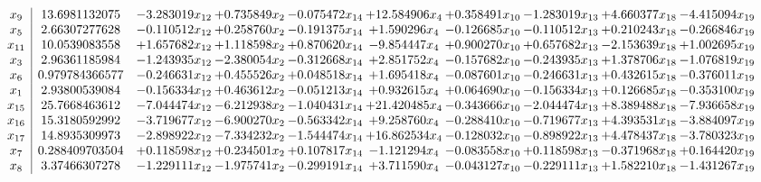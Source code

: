 \documentclass[10pt]{article}
\begin{document}
 \[\begin{array}{c| c c@{\hskip 2pt} c@{\hskip 2pt} c@{\hskip 2pt} c@{\hskip 2pt} c@{\hskip 2pt} c@{\hskip 2pt} c@{\hskip 2pt} c@{\hskip 2pt} }
 x_{9}   &  13.6981132075 & -3.283019 x_{12} & + 0.735849 x_{2} & -0.075472 x_{14} & + 12.584906 x_{4} & + 0.358491 x_{10} & -1.283019 x_{13} & + 4.660377 x_{18} & -4.415094 x_{19}\\
 x_{5}   &  2.66307277628 & -0.110512 x_{12} & + 0.258760 x_{2} & -0.191375 x_{14} & + 1.590296 x_{4} & -0.126685 x_{10} & -0.110512 x_{13} & + 0.210243 x_{18} & -0.266846 x_{19}\\
 x_{11}   &  10.0539083558 & + 1.657682 x_{12} & + 1.118598 x_{2} & + 0.870620 x_{14} & -9.854447 x_{4} & + 0.900270 x_{10} & + 0.657682 x_{13} & -2.153639 x_{18} & + 1.002695 x_{19}\\
 x_{3}   &  2.96361185984 & -1.243935 x_{12} & -2.380054 x_{2} & -0.312668 x_{14} & + 2.851752 x_{4} & -0.157682 x_{10} & -0.243935 x_{13} & + 1.378706 x_{18} & -1.076819 x_{19}\\
 x_{6}   &  0.979784366577 & -0.246631 x_{12} & + 0.455526 x_{2} & + 0.048518 x_{14} & + 1.695418 x_{4} & -0.087601 x_{10} & -0.246631 x_{13} & + 0.432615 x_{18} & -0.376011 x_{19}\\
 x_{1}   &  2.93800539084 & -0.156334 x_{12} & + 0.463612 x_{2} & -0.051213 x_{14} & + 0.932615 x_{4} & + 0.064690 x_{10} & -0.156334 x_{13} & + 0.126685 x_{18} & -0.353100 x_{19}\\
 x_{15}   &  25.7668463612 & -7.044474 x_{12} & -6.212938 x_{2} & -1.040431 x_{14} & + 21.420485 x_{4} & -0.343666 x_{10} & -2.044474 x_{13} & + 8.389488 x_{18} & -7.936658 x_{19}\\
 x_{16}   &  15.3180592992 & -3.719677 x_{12} & -6.900270 x_{2} & -0.563342 x_{14} & + 9.258760 x_{4} & -0.288410 x_{10} & -0.719677 x_{13} & + 4.393531 x_{18} & -3.884097 x_{19}\\
 x_{17}   &  14.8935309973 & -2.898922 x_{12} & -7.334232 x_{2} & -1.544474 x_{14} & + 16.862534 x_{4} & -0.128032 x_{10} & -0.898922 x_{13} & + 4.478437 x_{18} & -3.780323 x_{19}\\
 x_{7}   &  0.288409703504 & + 0.118598 x_{12} & + 0.234501 x_{2} & + 0.107817 x_{14} & -1.121294 x_{4} & -0.083558 x_{10} & + 0.118598 x_{13} & -0.371968 x_{18} & + 0.164420 x_{19}\\
 x_{8}   &  3.37466307278 & -1.229111 x_{12} & -1.975741 x_{2} & -0.299191 x_{14} & + 3.711590 x_{4} & -0.043127 x_{10} & -0.229111 x_{13} & + 1.582210 x_{18} & -1.431267 x_{19}\\

\end{array}\]
\end{document}
